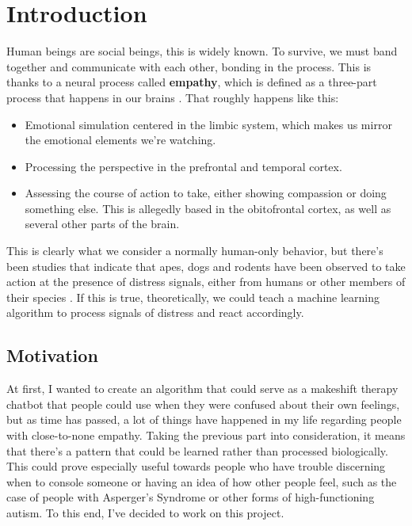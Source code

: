 \chapter{Introduction}
Human beings are social beings, this is widely known. To survive, we must band together and communicate with each other, bonding in the process. This is thanks to a neural process called \textbf{empathy}, which is defined as a three-part process that happens in our brains \citep{rf1}. That roughly happens like this:
\begin{itemize}
	\item Emotional simulation centered in the limbic system, which makes us mirror the emotional elements we're watching.
	\item Processing the perspective in the prefrontal and temporal cortex.
	\item Assessing the course of action to take, either showing compassion or doing something else. This is allegedly based in the obitofrontal cortex, as well as several other parts of the brain.
\end{itemize}
This is clearly what we consider a normally human-only behavior, but there's been studies that indicate that apes, dogs and rodents have been observed to take action at the presence of distress signals, either from humans or other members of their species \citep{rf2}.
If this is true, theoretically, we could teach a machine learning algorithm to process signals of distress and react accordingly.

\section{Motivation}
At first, I wanted to create an algorithm that could serve as a makeshift therapy chatbot that people could use when they were confused about their own feelings, but as time has passed, a lot of things have happened in my life regarding people with close-to-none empathy.
Taking the previous part into consideration, it means that there's a pattern that could be learned rather than processed biologically. This could prove especially useful towards people who have trouble discerning when to console someone or having an idea of how other people feel, such as the case of people with Asperger's Syndrome or other forms of high-functioning autism.
To this end, I've decided to work on this project.
\clearpage